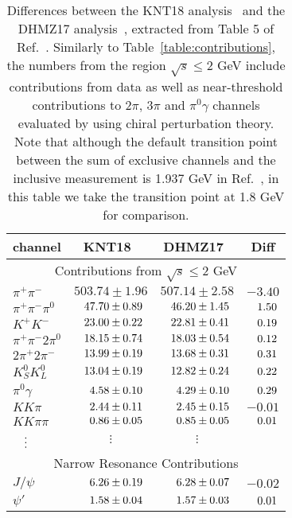 \begin{table*} 
\caption{Differences between the KNT18 analysis~\cite{KNT18} 
and the DHMZ17 analysis~\cite{DHMZ17}, extracted from 
Table 5 of Ref.~\cite{KNT18}. 
Similarly to Table~\ref{table:contributions}, the numbers
from the region $\sqrt{s} \leq 2$ GeV
include contributions from data as well as near-threshold
contributions to $2\pi$, $3\pi$ and $\pi^0\gamma$ channels
evaluated by using chiral perturbation theory.
Note that although the default transition point
between the sum of exclusive channels and the inclusive
measurement is 1.937 GeV in Ref.~\cite{KNT18}, in this 
table we take the transition point at 1.8 GeV for comparison.}
%
\label{table:comparison}
%
\begin{center} \begin{tabular}{|l|c|c|c|}
\hline
channel        & KNT18~\cite{KNT18}    & DHMZ17~\cite{HLMNT} & Diff \\
\hline
\multicolumn{4}{|c|}{Contributions from $\sqrt{s} \leq 2$ GeV} \\
\hline
$\pi^+\pi^-$   &    $503.74 \pm 1.96$  &    $507.14 \pm 2.58$    & $-3.40$ \\
$\pi^+\pi^-\pi^0$
               & $\hpz47.70 \pm 0.89$  & $\hpz46.20 \pm 1.45$ & $\hph1.50$ \\
$K^+ K^-$      & $\hpz23.00 \pm 0.22$  & $\hpz22.81 \pm 0.41$ & $\hph0.19$ \\
$\pi^+ \pi^- 2\pi^0$
               & $\hpz18.15 \pm 0.74$  & $\hpz18.03 \pm 0.54$ & $\hph0.12$ \\
$2\pi^+ 2\pi^-$& $\hpz13.99 \pm 0.19$  & $\hpz13.68 \pm 0.31$ & $\hph0.31$\\
$K_S^0 K_L^0$  & $\hpz13.04 \pm 0.19$  & $\hpz12.82 \pm 0.24$ & $\hph0.22$ \\
$\pi^0 \gamma$ & $\hpzz4.58 \pm 0.10$  & $\hpzz4.29 \pm 0.10$ & $\hph0.29$ \\
$KK\pi$        & $\hpzz2.44 \pm 0.11$  & $\hpzz2.45 \pm 0.15$ & $-0.01$ \\
$KK\pi\pi$     & $\hpzz0.86 \pm 0.05$  & $\hpzz0.85 \pm 0.05$ & $\hph0.01$ \\
$\hpzz\vdots$  &  $\vdots$  &  $\vdots$   & \\
\hline 
\multicolumn{4}{|c|}{Narrow Resonance Contributions} \\
\hline
$J/\psi$         & $\hpzz6.26 \pm 0.19$  & $\hpzz6.28 \pm 0.07$ & $-0.02$ \\
$\psi'$          & $\hpzz1.58 \pm 0.04$  & $\hpzz1.57 \pm 0.03$ & $\hph0.01$ \\

\end{tabular}
\end{center}
\end{table*}
